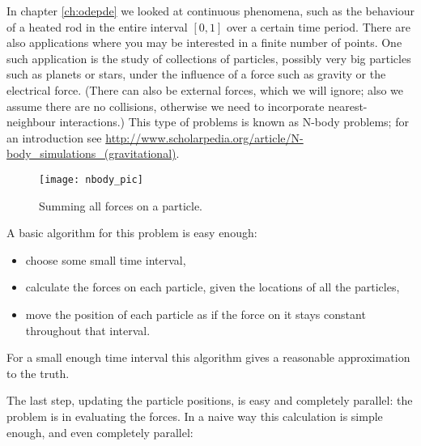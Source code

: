 

In chapter \ref{ch:odepde} we looked at continuous phenomena, such as
the behaviour of a heated rod in the entire interval $[0,1]$ over a
certain time period. There are also applications where you may be
interested in a finite number of points. One such application is the
study of collections of particles, possibly very big particles such as
planets or stars, under the influence of a force such as gravity or
the electrical force. (There can also be external forces, which we
will ignore; also we assume there are no collisions, otherwise we need
to incorporate nearest-neighbour interactions.) This type of problems
is known as N-body problems; for an introduction
see \url{http://www.scholarpedia.org/article/N-body_simulations_(gravitational)}.

\begin{wrapfigure}{r}{2.5in}
\texttt{[image: nbody\_pic]}
\caption{Summing all forces on a particle.}
\hbox{}\kern-1.5in\hbox{}%
\end{wrapfigure}
%
A basic algorithm for this problem is easy enough:
\begin{itemize}
\item choose some small time interval,
\item calculate the forces on each particle, given the locations of
  all the particles,
\item move the position of each particle as if the force on it stays
  constant throughout that interval.
\end{itemize}
For a small enough time interval this algorithm gives a reasonable approximation to the truth. 

The last step, updating the particle positions, is easy and completely
parallel: the problem is in evaluating the forces. In a naive way this
calculation is simple enough, and even completely parallel:

